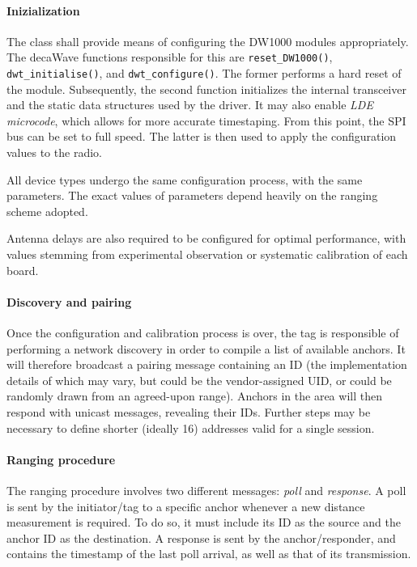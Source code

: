 \paragraph{Inizialization}
The class shall provide means of configuring the DW1000 modules appropriately.
The decaWave functions responsible for this are \texttt{reset\_DW1000()},  \texttt{dwt\_initialise()}, and \texttt{dwt\_configure()}.
The former performs a hard reset of the module.
Subsequently, the second function initializes the internal transceiver and the static data structures used by the driver.
It may also enable \emph{LDE microcode}, which allows for more accurate timestaping.
From this point, the SPI bus can be set to full speed.
The latter is then used to apply the configuration values to the radio.

All device types undergo the same configuration process, with the same parameters.
The exact values of parameters depend heavily on the ranging scheme adopted.

Antenna delays are also required to be configured for optimal performance, with values stemming from experimental observation or systematic calibration of each board.


\paragraph{Discovery and pairing}
Once the configuration and calibration process is over, the tag is responsible of performing a network discovery in order to compile a list of available anchors.
It will therefore broadcast a pairing message containing an ID (the implementation details of which may vary, but could be the vendor-assigned UID, or could be randomly drawn from an agreed-upon range).
Anchors in the area will then respond with unicast messages, revealing their IDs.
Further steps may be necessary to define shorter (ideally \SI{16}{\bit}) addresses valid for a single session.


\paragraph{Ranging procedure}
The ranging procedure involves two different messages: \emph{poll} and \emph{response}.
A poll is sent by the initiator/tag to a specific anchor whenever a new distance measurement is required.
To do so, it must include its ID as the source and the anchor ID as the destination.
A response is sent by the anchor/responder, and contains the timestamp of the last poll arrival, as well as that of its transmission.

